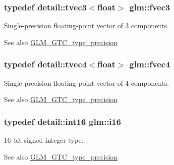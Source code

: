\subsubsection[{fvec3}]{\setlength{\rightskip}{0pt plus 5cm}typedef detail\+::tvec3$<$float$>$ {\bf glm\+::fvec3}}\label{group__gtc__type__precision_gaa3a8ce13ad981d1e1791070f52a885c7}
Single-\/precision floating-\/point vector of 3 components. \begin{DoxySeeAlso}{See also}
\hyperlink{group__gtc__type__precision}{G\+L\+M\+\_\+\+G\+T\+C\+\_\+type\+\_\+precision} 
\end{DoxySeeAlso}
\hypertarget{group__gtc__type__precision_ga5130b151317f24b13f1d0aa999f5fa36}{}
\subsubsection[{fvec4}]{\setlength{\rightskip}{0pt plus 5cm}typedef detail\+::tvec4$<$float$>$ {\bf glm\+::fvec4}}\label{group__gtc__type__precision_ga5130b151317f24b13f1d0aa999f5fa36}
Single-\/precision floating-\/point vector of 4 components. \begin{DoxySeeAlso}{See also}
\hyperlink{group__gtc__type__precision}{G\+L\+M\+\_\+\+G\+T\+C\+\_\+type\+\_\+precision} 
\end{DoxySeeAlso}
\hypertarget{group__gtc__type__precision_ga35e5542ca05b29cc256fdafb8503d1fd}{}
\subsubsection[{i16}]{\setlength{\rightskip}{0pt plus 5cm}typedef detail\+::int16 {\bf glm\+::i16}}\label{group__gtc__type__precision_ga35e5542ca05b29cc256fdafb8503d1fd}
16 bit signed integer type. \begin{DoxySeeAlso}{See also}
\hyperlink{group__gtc__type__precision}{G\+L\+M\+\_\+\+G\+T\+C\+\_\+type\+\_\+precision} 
\end{DoxySeeAlso}
\hypertarget{group__gtc__type__precision_ga95c6d9b5d9d140fad7405496484ec622}{}
